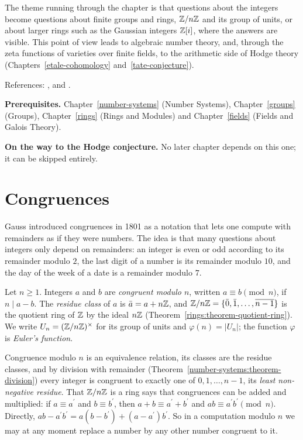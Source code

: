 The theme running through the chapter is that questions about the integers become questions about finite groups and rings, $\mathbb{Z}/n\mathbb{Z}$ and its group of units, or about larger rings such as the Gaussian
integers $\mathbb{Z}[i]$, where the answers are visible. This point of view leads to algebraic number theory, and, through the zeta functions of varieties over finite fields, to the arithmetic side of Hodge theory
(Chapters~\ref{etale-cohomology} and~\ref{tate-conjecture}).

References: \cite{ireland-rosen}, \cite{serre-arithmetic} and \cite{hardy-wright}.

\noindent\textbf{Prerequisites.} Chapter~\ref{number-systems} (Number Systems), Chapter~\ref{groups} (Groups), Chapter~\ref{rings} (Rings and Modules) and Chapter~\ref{fields} (Fields and Galois Theory).

\noindent\textbf{On the way to the Hodge conjecture.} No later chapter depends on this one; it can be skipped entirely.

\section{Congruences}\label{number-theory:section-congruences}

Gauss introduced congruences in 1801 as a notation that lets one compute with remainders as if they were numbers. The idea is that many questions about integers only depend on remainders: an integer
is even or odd according to its remainder modulo $2$, the last digit of a number is its remainder modulo $10$, and the day of the week of a date is a remainder modulo $7$.

\begin{definition}\label{number-theory:definition-congruence}
Let $n \geq 1$. Integers $a$ and $b$ are \emph{congruent modulo $n$}, written $a \equiv b \pmod n$, if $n \mid a - b$. The \emph{residue class} of $a$ is $\bar{a} = a + n\mathbb{Z}$, and
$\mathbb{Z}/n\mathbb{Z} = \{\bar{0}, \bar{1}, \ldots, \overline{n - 1}\}$ is the quotient ring of $\mathbb{Z}$ by the ideal $n\mathbb{Z}$ (Theorem~\ref{rings:theorem-quotient-ring}). We write $U_n = (\mathbb{Z}/n\mathbb{Z})^\times$ for its group of units
and $\varphi(n) = |U_n|$; the function $\varphi$ is \emph{Euler's function}.
\end{definition}

Congruence modulo $n$ is an equivalence relation, its classes are the residue classes, and by division with remainder (Theorem~\ref{number-systems:theorem-division}) every integer is congruent to
exactly one of $0, 1, \ldots, n - 1$, its \emph{least non-negative residue}. That $\mathbb{Z}/n\mathbb{Z}$ is a ring says that congruences can be added and multiplied: if $a \equiv a^{\prime}$ and $b \equiv b^{\prime}$, then
$a + b \equiv a^{\prime} + b^{\prime}$ and $ab \equiv a^{\prime}b^{\prime} \pmod n$. Directly, $ab - a^{\prime}b^{\prime} = a(b - b^{\prime}) + (a - a^{\prime})b^{\prime}$. So in a computation modulo $n$ we may at any
moment replace a number by any other number congruent to it.

